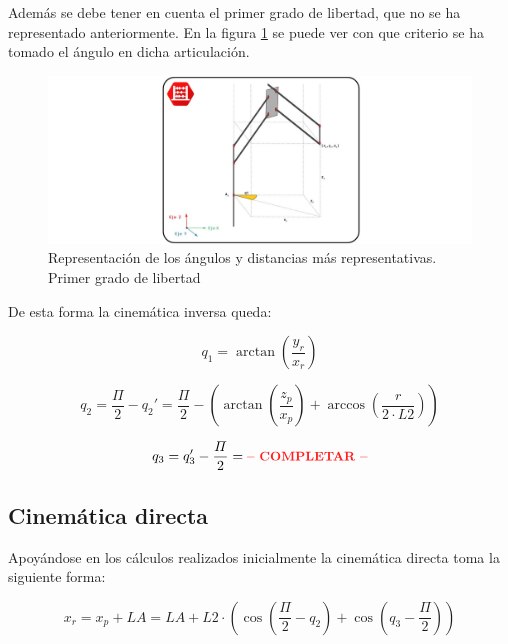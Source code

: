     Además se debe tener en cuenta el primer grado de libertad, que no se ha representado anteriormente. En la figura \ref{fig:Control:cinematica_2} se puede ver con que criterio se ha tomado el ángulo en dicha articulación.

    \begin{figure}[H]
        \centering
        \includegraphics[width=1\textwidth]{figuras/Imagenes_cinematica/cinematica_2.jpg}
        \caption{Representación de los ángulos y distancias más representativas. Primer grado de libertad}
        \label{fig:Control:cinematica_2}
    \end{figure}

    De esta forma la cinemática inversa queda:

    \begin{equation}
        q_1 = \arctan\left(\frac{y_r}{x_r}\right)
    \end{equation}

    \begin{equation}
        q_2 = \frac{\varPi}{2} - q_2' = \frac{\varPi}{2} - \left(\arctan\left(\frac{z_p}{x_p}\right) + \arccos\left(\frac{r}{2 \cdot L2}\right)\right)
    \end{equation}

    \begin{equation}
        q_3 = q_3'- \frac{\varPi}{2} = \textnormal{\completar}
    \end{equation}


\subsection{Cinemática directa}

    Apoyándose en los cálculos realizados inicialmente la cinemática directa toma la siguiente forma:

    \begin{equation}
        x_r = x_p+LA = LA + L2 \cdot \left( \cos\left(\frac{\varPi}{2}-q_2\right) + \cos\left(q_3-\frac{\varPi}{2}\right) \right)
    \end{equation}

